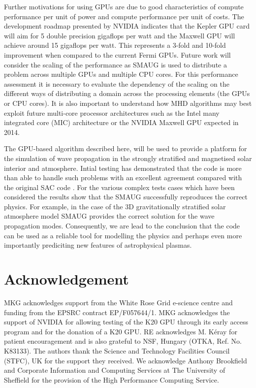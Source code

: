 \documentclass[final,1p]{elsarticle}
\begin{document}
Further motivations for using GPUs are due to good characteristics of compute performance per unit of power and compute performance per unit of costs. The development roadmap presented by NVIDIA indicates that the Kepler GPU card will aim for 5 double precision gigaflops per watt and the Maxwell GPU will achieve around 15 gigaflops per watt. This represents a 3-fold and 10-fold improvement when compared to the current Fermi GPUs.  Future work will consider the scaling of the performance as SMAUG is used to distribute a problem across multiple GPUs and multiple CPU cores. For this performance assessment it is necessary to evaluate the dependency of the scaling on the different ways of distributing a domain across the processing elements (the GPUs or CPU cores). It is also important to understand how MHD algorithms may best exploit future multi-core processor architectures such as the Intel many integrated core (MIC) architecture or the NVIDIA Maxwell GPU expected in 2014.

The GPU-based algorithm described here, will be used to provide a platform for the simulation of  wave propagation in the strongly stratified and magnetised solar interior and atmosphere. Intial testing has demonstrated that the code is more than able to handle such problems with an excellent agreement compared with the original SAC code \cite{Shelyag2008}. For the various complex tests cases which have been considered the results show that the SMAUG successfully reproduces the correct physics. For example, in the case of the 3D gravitationally stratified solar atmosphere model SMAUG  provides the correct solution for the wave propagation modes. Consequently, we are lead to the conclusion that the code can be used as a reliable tool for modelling the physics and perhaps even more importantly prediciting new features of astrophysical plasmas.




\section{Acknowledgement}
MKG acknowledges support from the White Rose Grid e-science centre and funding from the EPSRC contract EP/F057644/1.
MKG acknowledges the support of NVIDIA for allowing testing of the K20 GPU through its early access program and for the donation of a K20 GPU. 
RE acknowledges M. K\'eray for patient encouragement and is also grateful to NSF, Hungary (OTKA, Ref. No. K83133). 
The authors thank the Science and Technology Facilities Council (STFC), UK for the support they received. We acknowledge Anthony Brookfield and Corporate Information and Computing Services at The University of Sheffield for the provision of the High Performance Computing Service.
\end{document}
